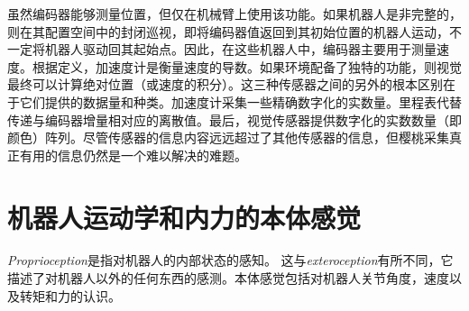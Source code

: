 虽然编码器能够测量位置，但仅在机械臂上使用该功能。如果机器人是非完整的，则在其配置空间中的封闭巡视，即将编码器值返回到其初始位置的机器人运动，不一定将机器人驱动回其起始点。因此，在这些机器人中，编码器主要用于测量速度。根据定义，加速度计是衡量速度的导数。如果环境配备了独特的功能，则视觉最终可以计算绝对位置（或速度的积分）。这三种传感器之间的另外的根本区别在于它们提供的数据量和种类。加速度计采集一些精确数字化的实数量。里程表代替传递与编码器增量相对应的离散值。最后，视觉传感器提供数字化的实数数量（即颜色）阵列。尽管传感器的信息内容远远超过了其他传感器的信息，但樱桃采集真正有用的信息仍然是一个难以解决的难题。



\section{机器人运动学和内力的本体感觉}
\emph{Proprioception}是指对机器人的内部状态的感知。
这与\emph{exteroception}有所不同，它描述了对机器人以外的任何东西的感测。本体感觉包括对机器人关节角度，速度以及转矩和力的认识。

